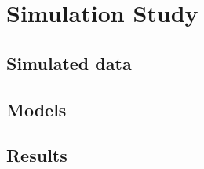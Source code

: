 \chapter{Simulation Study} \label{chap:simulation}

\section{Simulated data}

\section{Models}

\section{Results}


